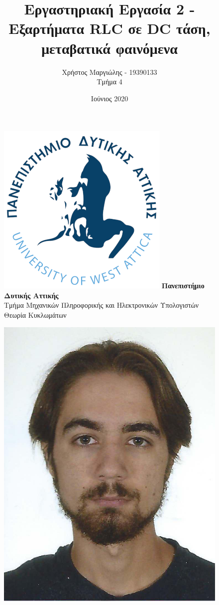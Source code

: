 \documentclass{article}
\title{Εργαστηριακή Εργασία 2 - Εξαρτήματα RLC σε DC τάση, μεταβατικά φαινόμενα}
\author{Χρήστος Μαργιώλης - 19390133 \\ Τμήμα 4}
\date{Ιούνιος 2020}
\begin{document}
\begin{figure}[t!]
    \centering
    \includegraphics[scale=0.3, center]{./res/Logo_University_of_West_Attica.png}
    \Large
    \textbf{Πανεπιστήμιο Δυτικής Αττικής} \\
    \large
    Τμήμα Μηχανικών Πληροφορικής και Ηλεκτρονικών Υπολογιστών \\
    Θεωρία Κυκλωμάτων
\end{figure}
\begin{figure}[b]
    \centering
    \includegraphics[scale=1]{./res/19390133.jpeg}
\end{figure}
\end{document}
